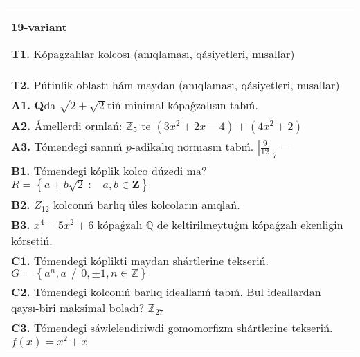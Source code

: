 \documentclass{article}
\begin{document}
\begin{tabular}{m{17cm}}
\textbf{19-variant}
\newline

\textbf{T1.} Kópagzalılar kolcosı (anıqlaması, qásiyetleri, mısallar) \\
\textbf{T2.} Pútinlik oblastı hám maydan (anıqlaması, qásiyetleri, mısallar) \\
\textbf{A1.} \(\mathbf{Q}\)da \(\sqrt{2 + \sqrt{2}}\)tiń minimal kópaǵzalısın tabıń. \\
\textbf{A2.} Ámellerdi orınlań: \(\mathbb{Z}_{5}\) te \(\left( 3x^{2} + 2x - 4 \right) + \left( 4x^{2} + 2 \right)\) \\
\textbf{A3.} Tómendegi sannıń \(p\)-adikalıq normasın tabıń. \(|\frac{9}{12}|_{7} =\) \\
\textbf{B1.} Tómendegi kóplik kolco dúzedi ma? \(R = \left\{ a + b\sqrt{2}\ :\ \ \ \ a,b \in \mathbf{Z} \right\}\) \\
\textbf{B2.} \(Z_{12}\) kolconıń barlıq úles kolcoların anıqlań. \\
\textbf{B3.} \(x^{4} - 5x^{2} + 6\) kópaǵzalı \(\mathbb{Q}\) de keltirilmeytuǵın kópaǵzalı ekenligin kórsetiń. \\
\textbf{C1.} Tómendegi kóplikti maydan shártlerine tekseriń. \(G = \left\{ a^{n},a \neq 0, \pm 1,n \in \mathbb{Z} \right\}\) \\
\textbf{C2.} Tómendegi kolconıń barlıq ideallarıń tabıń. Bul ideallardan qaysı-biri maksimal boladı? \(\mathbb{Z}_{27}\) \\
\textbf{C3.} Tómendegi sáwlelendiriwdi gomomorfizm shártlerine tekseriń. \(f(x) = x^{2} + x\) \\

\end{tabular}
\vspace{1cm}
\end{document}
